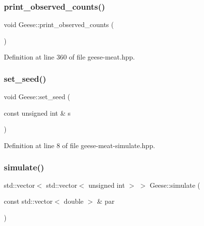 \mbox{\label{class_geese_a3b63231475f73a59b94bb4443c8aa7b8}} 
\subsubsection{\texorpdfstring{print\+\_\+observed\+\_\+counts()}{print\_observed\_counts()}}
{\footnotesize\ttfamily void Geese\+::print\+\_\+observed\+\_\+counts (\begin{DoxyParamCaption}{ }\end{DoxyParamCaption})\hspace{0.3cm}{\ttfamily [inline]}}



Definition at line 360 of file geese-\/meat.\+hpp.

\mbox{\label{class_geese_aa5d623d5e242a29090bf5a01bfeeeb9f}} 
\subsubsection{\texorpdfstring{set\+\_\+seed()}{set\_seed()}}
{\footnotesize\ttfamily void Geese\+::set\+\_\+seed (\begin{DoxyParamCaption}\item[{const unsigned int \&}]{s }\end{DoxyParamCaption})\hspace{0.3cm}{\ttfamily [inline]}}



Definition at line 8 of file geese-\/meat-\/simulate.\+hpp.

\mbox{\label{class_geese_a675662efdded0d24c146946aa15ed481}} 
\subsubsection{\texorpdfstring{simulate()}{simulate()}}
{\footnotesize\ttfamily std\+::vector$<$ std\+::vector$<$ unsigned int $>$ $>$ Geese\+::simulate (\begin{DoxyParamCaption}\item[{const std\+::vector$<$ double $>$ \&}]{par }\end{DoxyParamCaption})\hspace{0.3cm}{\ttfamily [inline]}}



